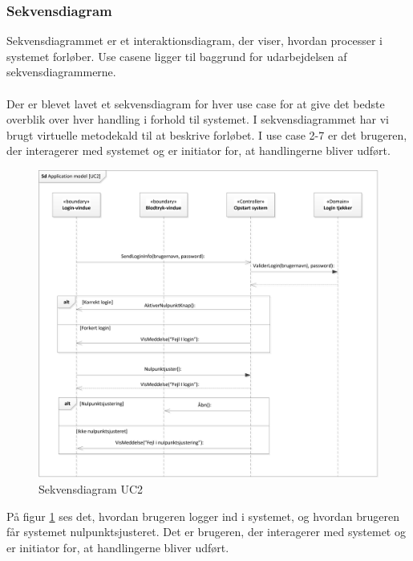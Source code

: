 \subsubsection{Sekvensdiagram}
Sekvensdiagrammet er et interaktionsdiagram, der viser, hvordan processer i systemet forløber. Use casene ligger til baggrund for udarbejdelsen af sekvensdiagrammerne.\\ \\
Der er blevet lavet et sekvensdiagram for hver use case for at give det bedste overblik over hver handling i forhold til systemet. I sekvensdiagrammet har vi brugt virtuelle metodekald til at beskrive forløbet. I use case 2-7 er det brugeren, der interagerer med systemet og er initiator for, at handlingerne bliver udført.

\begin{figure}[H]
	\centering
	\includegraphics[width=1\textwidth]{Figurer/ISE/sdAppModelUC2}
	\caption{Sekvensdiagram UC2}
	\label{sd UC2}
\end{figure}

På figur \ref{sd UC2} ses det, hvordan brugeren logger ind i systemet, og hvordan brugeren får systemet nulpunktsjusteret. Det er brugeren, der interagerer med systemet og er initiator for, at handlingerne bliver udført. 


